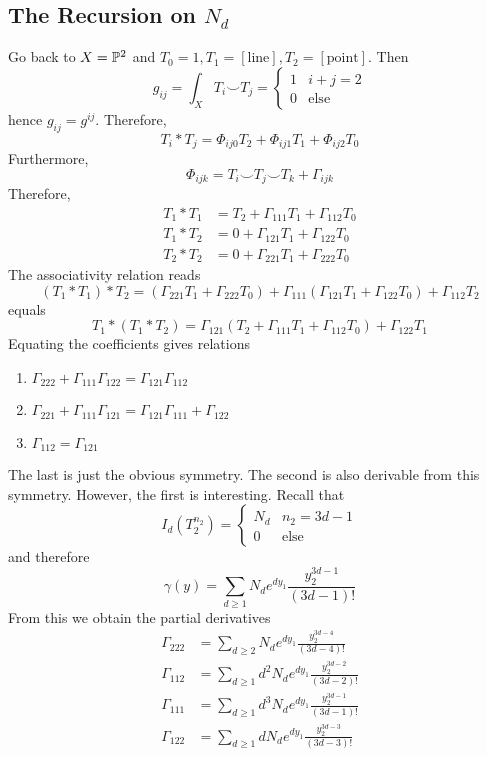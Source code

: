 \documentclass[12pt]{article}
\begin{document}
\subsection{The Recursion on $N_d$}

Go back to $X = \P^2$ and $T_0 = 1, T_1 = [\text{line}], T_2 = [\text{point}]$. Then
\[ g_{ij} = \int_X T_i \smile T_j = \begin{cases}
1 & i + j = 2
\\
0 & \text{else}
\end{cases} \]
hence $g_{ij} = g^{ij}$. Therefore,
\[ T_i * T_j = \Phi_{ij0} T_2 + \Phi_{ij1} T_1 + \Phi_{ij2} T_0 \]
Furthermore,
\[ \Phi_{ijk} = T_i \smile T_j \smile T_k + \Gamma_{ijk} \]
Therefore,
\begin{align*}
T_1 * T_1 &= T_2 + \Gamma_{111} T_1 + \Gamma_{112} T_0
\\
T_1 * T_2 &= 0 + \Gamma_{121} T_1 + \Gamma_{122} T_0
\\
T_2 * T_2 &= 0 + \Gamma_{221} T_1 + \Gamma_{222} T_0 
\end{align*}
The associativity relation reads
\[ (T_1 * T_1) * T_2 = (\Gamma_{221} T_1 + \Gamma_{222} T_0) + \Gamma_{111} (\Gamma_{121} T_1 + \Gamma_{122} T_0) + \Gamma_{112} T_2 \]
equals
\[ T_1 * (T_1 * T_2) = \Gamma_{121} (T_2 + \Gamma_{111} T_1 + \Gamma_{112} T_0) + \Gamma_{122} T_1 \]
Equating the coefficients gives relations
\begin{enumerate}
\item $\Gamma_{222}  + \Gamma_{111} \Gamma_{122} = \Gamma_{121} \Gamma_{112}$
\item $\Gamma_{221} + \Gamma_{111} \Gamma_{121} = \Gamma_{121} \Gamma_{111} + \Gamma_{122}$
\item $\Gamma_{112} = \Gamma_{121}$
\end{enumerate}
The last is just the obvious symmetry. The second is also derivable from this symmetry. However, the first is interesting. Recall that
\[ I_d(T_2^{n_2}) = 
\begin{cases}
N_d & n_2 = 3d - 1
\\
0 & \text{else}
\end{cases} \]
and therefore
\[ \gamma(y) = \sum_{d \ge 1} N_d e^{d y_1} \frac{y_2^{3 d - 1}}{(3d - 1)!} \]
From this we obtain the partial derivatives
\begin{align*}
\Gamma_{222} &= \sum_{d \ge 2} N_d e^{d y_1} \frac{y_2^{3 d - 4}}{(3d - 4)!}
\\
\Gamma_{112} &= \sum_{d \ge 1} d^2 N_d e^{d y_1} \frac{y_2^{3 d - 2}}{(3d - 2)!}
\\
\Gamma_{111} &= \sum_{d \ge 1} d^3 N_d e^{d y_1} \frac{y_2^{3 d - 1}}{(3d - 1)!}
\\
\Gamma_{122} &= \sum_{d \ge 1} d N_d e^{d y_1} \frac{y_2^{3 d - 3}}{(3d - 3)!}
\end{align*}
\end{document}

